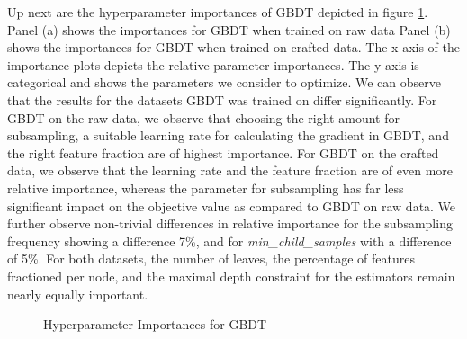 Up next are the hyperparameter importances of GBDT depicted in figure \ref{fig:GBDT_Importances}. Panel (a) shows the importances for GBDT when trained on raw data
Panel (b) shows the importances for GBDT when trained on crafted data.
The x-axis of the importance plots depicts the relative parameter importances. 
The y-axis is categorical and shows the parameters we consider to optimize. 
We can observe that the results for the datasets GBDT was trained on differ significantly. 
For GBDT on the raw data, we observe that choosing the right amount for subsampling, a suitable learning rate for calculating the gradient in GBDT, and the right feature fraction are of highest importance. For GBDT on the crafted data, we observe that the learning rate and the feature fraction are of even more relative importance, whereas the parameter for subsampling has far less significant impact on the objective value as compared to GBDT on raw data. 
We further observe non-trivial differences in relative importance for the subsampling frequency showing a difference 7\%, and for \textit{min\_child\_samples} with a difference of 5\%. For both datasets, the number of leaves, the percentage of features fractioned per node, and the maximal depth constraint for the estimators remain nearly equally important.   
\begin{figure}[h]
	\centering
	\caption{Hyperparameter Importances for GBDT}
	\label{fig:GBDT_Importances}
\end{figure}

